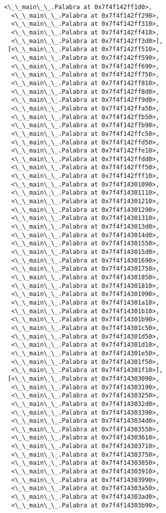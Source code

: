 \documentclass[12pt,a4paper,table]{article}
\begin{document}
\begin{tcolorbox}[breakable, size=fbox, boxrule=.5pt, pad at break*=1mm, opacityfill=0]
\begin{Verbatim}[commandchars=\\\{\}]
  <\_\_main\_\_.Palabra at 0x7f4f142ff1d0>,
  <\_\_main\_\_.Palabra at 0x7f4f142ff290>,
  <\_\_main\_\_.Palabra at 0x7f4f142ff310>,
  <\_\_main\_\_.Palabra at 0x7f4f142ff410>,
  <\_\_main\_\_.Palabra at 0x7f4f142ff3d0>],
 [<\_\_main\_\_.Palabra at 0x7f4f142ff510>,
  <\_\_main\_\_.Palabra at 0x7f4f142ff590>,
  <\_\_main\_\_.Palabra at 0x7f4f142ff690>,
  <\_\_main\_\_.Palabra at 0x7f4f142ff750>,
  <\_\_main\_\_.Palabra at 0x7f4f142ff810>,
  <\_\_main\_\_.Palabra at 0x7f4f142ff8d0>,
  <\_\_main\_\_.Palabra at 0x7f4f142ff9d0>,
  <\_\_main\_\_.Palabra at 0x7f4f142ffa50>,
  <\_\_main\_\_.Palabra at 0x7f4f142ffb50>,
  <\_\_main\_\_.Palabra at 0x7f4f142ffb90>,
  <\_\_main\_\_.Palabra at 0x7f4f142ffc50>,
  <\_\_main\_\_.Palabra at 0x7f4f142ffd50>,
  <\_\_main\_\_.Palabra at 0x7f4f142ffe10>,
  <\_\_main\_\_.Palabra at 0x7f4f142ffdd0>,
  <\_\_main\_\_.Palabra at 0x7f4f142fff50>,
  <\_\_main\_\_.Palabra at 0x7f4f142fff10>,
  <\_\_main\_\_.Palabra at 0x7f4f14301090>,
  <\_\_main\_\_.Palabra at 0x7f4f14301110>,
  <\_\_main\_\_.Palabra at 0x7f4f14301210>,
  <\_\_main\_\_.Palabra at 0x7f4f14301290>,
  <\_\_main\_\_.Palabra at 0x7f4f14301310>,
  <\_\_main\_\_.Palabra at 0x7f4f143013d0>,
  <\_\_main\_\_.Palabra at 0x7f4f143014d0>,
  <\_\_main\_\_.Palabra at 0x7f4f14301550>,
  <\_\_main\_\_.Palabra at 0x7f4f143015d0>,
  <\_\_main\_\_.Palabra at 0x7f4f14301690>,
  <\_\_main\_\_.Palabra at 0x7f4f14301750>,
  <\_\_main\_\_.Palabra at 0x7f4f14301850>,
  <\_\_main\_\_.Palabra at 0x7f4f14301810>,
  <\_\_main\_\_.Palabra at 0x7f4f14301990>,
  <\_\_main\_\_.Palabra at 0x7f4f14301a10>,
  <\_\_main\_\_.Palabra at 0x7f4f14301b10>,
  <\_\_main\_\_.Palabra at 0x7f4f14301b90>,
  <\_\_main\_\_.Palabra at 0x7f4f14301c50>,
  <\_\_main\_\_.Palabra at 0x7f4f14301d50>,
  <\_\_main\_\_.Palabra at 0x7f4f14301d10>,
  <\_\_main\_\_.Palabra at 0x7f4f14301e50>,
  <\_\_main\_\_.Palabra at 0x7f4f14301f50>,
  <\_\_main\_\_.Palabra at 0x7f4f14301f10>],
 [<\_\_main\_\_.Palabra at 0x7f4f14303090>,
  <\_\_main\_\_.Palabra at 0x7f4f14303190>,
  <\_\_main\_\_.Palabra at 0x7f4f14303250>,
  <\_\_main\_\_.Palabra at 0x7f4f143032d0>,
  <\_\_main\_\_.Palabra at 0x7f4f14303390>,
  <\_\_main\_\_.Palabra at 0x7f4f143034d0>,
  <\_\_main\_\_.Palabra at 0x7f4f14303550>,
  <\_\_main\_\_.Palabra at 0x7f4f14303610>,
  <\_\_main\_\_.Palabra at 0x7f4f14303710>,
  <\_\_main\_\_.Palabra at 0x7f4f14303750>,
  <\_\_main\_\_.Palabra at 0x7f4f14303850>,
  <\_\_main\_\_.Palabra at 0x7f4f14303910>,
  <\_\_main\_\_.Palabra at 0x7f4f14303990>,
  <\_\_main\_\_.Palabra at 0x7f4f14303a50>,
  <\_\_main\_\_.Palabra at 0x7f4f14303ad0>,
  <\_\_main\_\_.Palabra at 0x7f4f14303b90>,

\end{Verbatim}
\end{tcolorbox}
\end{document}
